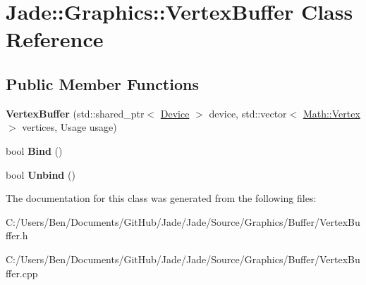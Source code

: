 \hypertarget{class_jade_1_1_graphics_1_1_vertex_buffer}{}\section{Jade\+:\+:Graphics\+:\+:Vertex\+Buffer Class Reference}
\label{class_jade_1_1_graphics_1_1_vertex_buffer}
\subsection*{Public Member Functions}
\begin{DoxyCompactItemize}
\item 
\hypertarget{class_jade_1_1_graphics_1_1_vertex_buffer_a0c8126f795b92a17bd1efdf3cfda040c}{}{\bfseries Vertex\+Buffer} (std\+::shared\+\_\+ptr$<$ \hyperlink{class_jade_1_1_graphics_1_1_device}{Device} $>$ device, std\+::vector$<$ \hyperlink{struct_jade_1_1_math_1_1_vertex}{Math\+::\+Vertex} $>$ vertices, Usage usage)\label{class_jade_1_1_graphics_1_1_vertex_buffer_a0c8126f795b92a17bd1efdf3cfda040c}

\item 
\hypertarget{class_jade_1_1_graphics_1_1_vertex_buffer_af233c132d986c09b6d601257501a1670}{}bool {\bfseries Bind} ()\label{class_jade_1_1_graphics_1_1_vertex_buffer_af233c132d986c09b6d601257501a1670}

\item 
\hypertarget{class_jade_1_1_graphics_1_1_vertex_buffer_ad87300b7f26883d662693431971c16ec}{}bool {\bfseries Unbind} ()\label{class_jade_1_1_graphics_1_1_vertex_buffer_ad87300b7f26883d662693431971c16ec}

\end{DoxyCompactItemize}


The documentation for this class was generated from the following files\+:\begin{DoxyCompactItemize}
\item 
C\+:/\+Users/\+Ben/\+Documents/\+Git\+Hub/\+Jade/\+Jade/\+Source/\+Graphics/\+Buffer/Vertex\+Buffer.\+h\item 
C\+:/\+Users/\+Ben/\+Documents/\+Git\+Hub/\+Jade/\+Jade/\+Source/\+Graphics/\+Buffer/Vertex\+Buffer.\+cpp\end{DoxyCompactItemize}
